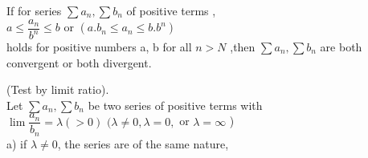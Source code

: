 \documentclass[11pt]{amsbook}
\begin{document}
  \begin{cor}
  
  \hspace*{20pt} If for series $\sum a_n , \sum b_n $ of positive terms ,\\
  
  \hspace*{70pt} $ a \leq \dfrac{a_n}{b^n} \leq b $ or 
  $(a.b_n \leq a_n \leq b.b^n) $\\
  
  holds for positive numbers a, b for all $ n>N$ ,then 
  $ \sum a_n , \sum b_n$ are both \hspace*{18pt}convergent or both divergent.\\  
  
  
  \end{cor}
  
  
  
  \begin{thm}(Test by limit ratio).\\
  
  Let $\sum a_n , \sum b_n $ be two series of positive terms with \\
  
  \hspace*{70pt}$ \lim{\dfrac{a_n}{b_n}} = \lambda(>0)  $  $
  ( \lambda \neq 0 , \lambda = 0 ,$ or $ \lambda = \infty $   )\\
  
  a) if $ \lambda \neq 0$, the series are of the same nature,
  
  
  \end{thm}
  
  
  
  
  
  
  
  
  
  
  
  
  
  
\end{document}
